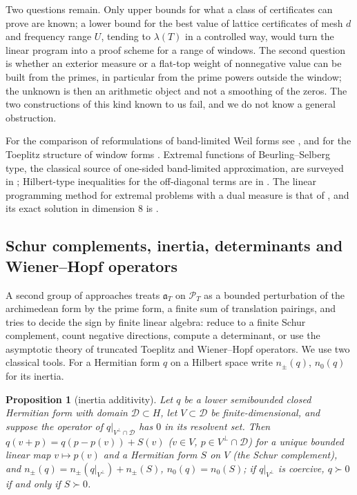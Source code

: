 \documentclass[11pt]{amsart}
\newtheorem{proposition}[theorem]{Proposition}
\theoremstyle{definition}
\theoremstyle{remark}
\numberwithin{equation}{section}
\newcommand{\PT}{\mathcal{P}_T}                        %
\newcommand{\aT}{\mathfrak{a}_T}                       %
\newcommand{\lam}{\lambda(T)}                          %
\begin{document}
Two questions remain. Only upper bounds for what a class of certificates can prove are known; a lower bound for the
best value of lattice certificates of mesh $d$ and frequency range $U$, tending to $\lam$ in a controlled way, would
turn the linear program into a proof scheme for a range of windows. The second question is whether an exterior measure
or a flat-top weight of nonnegative value can be built from the primes, in particular from the prime powers outside the
window; the unknown is then an arithmetic object and not a smoothing of the zeros. The two constructions of this kind
known to us fail, and we do not know a general obstruction.

For the comparison of reformulations of band-limited Weil forms see \cite{P12}, and for the Toeplitz structure of window
forms \cite{P26}. Extremal functions of Beurling--Selberg type, the classical source of one-sided band-limited
approximation, are surveyed in \cite{Vaaler1985}; Hilbert-type inequalities for the off-diagonal terms are in
\cite{MontgomeryVaughan1974}. The linear programming method for extremal problems with a dual measure is that of
\cite{CohnElkies2003}, and its exact solution in dimension $8$ is \cite{Viazovska2017}.

\subsection{Schur complements, inertia, determinants and Wiener--Hopf operators}\label{w5:sec:schur}\label{w5:fam:R8}

A second group of approaches treats $\aT$ on $\PT$ as a bounded perturbation of the archimedean form by the prime form, a
finite sum of translation pairings, and tries to decide the sign by finite linear algebra: reduce to a finite Schur
complement, count negative directions, compute a determinant, or use the asymptotic theory of truncated Toeplitz and
Wiener--Hopf operators. We use two classical tools. For a Hermitian form $q$ on a Hilbert space write $n_\pm(q)$,
$n_0(q)$ for its inertia.

\begin{proposition}[inertia additivity]\label{w5:prop:haynsworth}
Let $q$ be a lower semibounded closed Hermitian form with domain $\mathcal D\subset H$, let $V\subset\mathcal D$ be
finite-dimensional, and suppose the operator of $q|_{V^\perp\cap\mathcal D}$ has $0$ in its resolvent set. Then
$q(v+p)=q(p-p(v))+S(v)$ ($v\in V$, $p\in V^\perp\cap\mathcal D$) for a unique bounded linear map $v\mapsto p(v)$ and a
Hermitian form $S$ on $V$ (the Schur complement), and $n_\pm(q)=n_\pm(q|_{V^\perp})+n_\pm(S)$, $n_0(q)=n_0(S)$; if
$q|_{V^\perp}$ is coercive, $q\succ0$ if and only if $S\succ0$.
\end{proposition}
\end{document}
